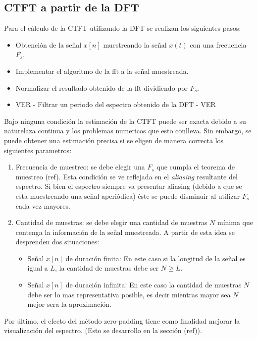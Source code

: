 \documentclass[11pt,a4paper]{article}
\begin{document}
 \subsection{ CTFT a partir de la DFT }
 Para el cálculo de la CTFT utilizando la DFT se realizan los siguientes pasos:
 \begin{itemize}
     \item Obtención de la señal $x[n]$ muestreando la señal $x(t)$ con una frecuencia $F_s$.
     \item Implementar el algoritmo de la fft a la señal muestreada.
     \item Normalizar el resultado obtenido de la fft dividiendo por $F_s$.
     \item VER - Filtrar un periodo del espectro obtenido de la DFT - VER
 \end{itemize}

 Bajo ninguna condición la estimación de la CTFT puede ser exacta debido a su naturelaza continua y los problemas numericos que esto conlleva. Sin embargo, se puede obtener una 
 estimación precisa si se eligen de manera correcta los siguientes parametros:
 \begin{enumerate}
     \item Frecuencia de muestreo: se debe elegir una $F_s$ que cumpla el teorema de muestreo (ref). Esta condición se ve reflejada en el \textit{aliasing} resultante del espectro. Si bien el espectro siempre va presentar aliasing (debido a que se esta muestreando una señal aperiódica) éste se puede disminuir al utilizar $F_s$ cada vez mayores.
     \item Cantidad de muestras: se debe elegir una cantidad de muestras $N$ mínima que contenga la información de la señal muestreada. A partir de esta idea se desprenden dos situaciones:
     \begin{itemize}
         \item Señal $x[n]$ de duración finita: En este caso si la longitud de la señal es igual a $L$, la cantidad de muestras debe ser $N \geq L$.
         \item Señal $x[n]$ de duración infinita: En este caso la cantidad de muestras $N$ debe ser lo mas representativa posible, es decir mientras mayor sea $N$ mejor sera la aproximación.
     \end{itemize}
\end{enumerate}

Por último, el efecto del método zero-padding tiene como finalidad mejorar la visualización del espectro. (Esto se desarrollo en la sección (ref)).
\end{document}
